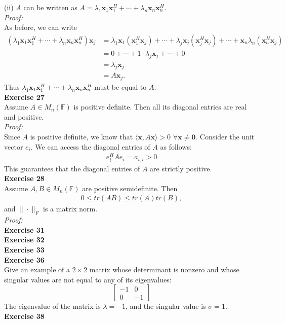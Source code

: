 \documentclass[letterpaper,12pt]{article}
\let\vec\mathbf
\theoremstyle{definition}
\begin{document}
(ii) $A$ can be written as $A = \lambda_1 \vec{x}_1 \vec{x}_1^H + \cdots + \lambda_n \vec{x}_n \vec{x}_n^H$. \\
\textit{Proof:} \\
As before, we can write
\begin{align*}
  (\lambda_1 \vec{x}_1 \vec{x}_1^H + \cdots + \lambda_n \vec{x}_n \vec{x}_n^H)\vec{x}_j
  &= \lambda_1 \vec{x}_1 (\vec{x}_1^H \vec{x}_j) + \cdots + \lambda_j \vec{x}_j (\vec{x}_j^H \vec{x}_j) + \cdots + \vec{x}_n \lambda_n (\vec{x}_n^H \vec{x}_j) \\
  &= 0 + \cdots + 1 \cdot \lambda_j \vec{x}_j + \cdots + 0 \\
  &= \lambda_j \vec{x}_j \\
  &= A \vec{x}_j.
\end{align*}
Thus $\lambda_1 \vec{x}_1 \vec{x}_1^H + \cdots + \lambda_n \vec{x}_n \vec{x}_n^H$ must be equal to $A$. \\

\textbf{Exercise 27} \\
Assume $A \in M_n(\mathbb{F})$ is positive definite. Then all its diagonal entries are real and positive. \\
\textit{Proof:} \\
Since $A$ is positive definite, we know that $\langle \vec{x}, A\vec{x} \rangle > 0$ $\forall \vec{x} \neq \vec{0}$. Consider the unit vector $e_i$. We can access the diagonal entries of $A$ as follows:
\begin{align*}
  e_i^H A e_i = a_{i,i} > 0
\end{align*}
This guarantees that the diagonal entries of $A$ are strictly positive. \\

\textbf{Exercise 28} \\
Assume $A, B \in M_n(\mathbb{F})$ are positive semidefinite. Then
\begin{align*}
  0 \leq tr(AB) \leq tr(A) tr(B),
\end{align*}
and $\|\cdot\|_F$ is a matrix norm. \\
\textit{Proof:} \\


\textbf{Exercise 31} \\

\textbf{Exercise 32} \\

\textbf{Exercise 33} \\

\textbf{Exercise 36} \\
Give an example of a $2 \times 2$ matrix whose determinant is nonzero and whose singular values are not equal to any of its eigenvalues:
\[
\begin{bmatrix}
  -1 & 0 \\
  0 & -1
\end{bmatrix}
\]
The eigenvalue of the matrix is $\lambda = -1$, and the singular value is $\sigma = 1$. \\

\textbf{Exercise 38} \\
\end{document}
